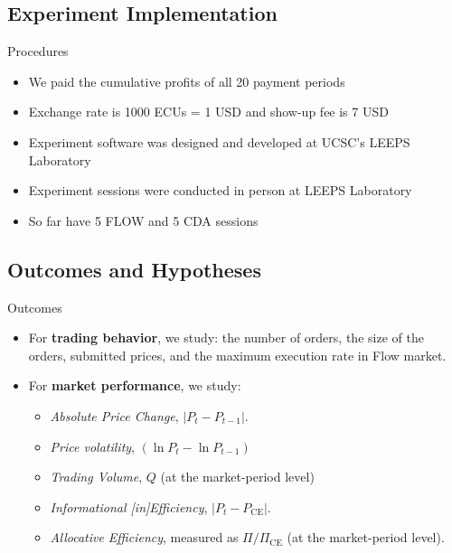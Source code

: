 \documentclass[10pt]{beamer}
\begin{document}
\subsection{Experiment Implementation}

\begin{frame}{Procedures}
    \begin{itemize}
        \item We paid the cumulative profits of all 20 payment periods
        \item Exchange rate is 1000 ECUs = 1 USD and show-up fee is 7 USD \pause
        \item Experiment software was designed and developed at UCSC's LEEPS Laboratory
        \item Experiment sessions were conducted in person at LEEPS Laboratory
        \item So far have 5  FLOW and 5 CDA sessions
    \end{itemize}
\end{frame}

\subsection{Outcomes and Hypotheses}


\begin{frame}{Outcomes}
    \begin{itemize}
        \item For \textbf{trading behavior}, we study: 
     the number of orders, the size of the orders, submitted prices, and
     the maximum execution rate in Flow market. \pause
        \item For \textbf{market performance}, we study:
        \begin{itemize}
        \item \textit{Absolute Price Change}, $|P_t - P_{t-1}|$. 
        \item \textit{Price volatility}, $(\ln P_t - \ln P_{t-1})$ 
         \item \textit{Trading Volume}, $Q$ (at the market-period level)
\item\textit{Informational [in]Efficiency},  \( |P_t - P_{\text{CE}}| \). 
    \item\textit{Allocative Efficiency}, measured as \( \Pi/\Pi_{\text{CE}}\) (at the market-period level). 
        \end{itemize}
     
    \end{itemize}
\end{frame}
\end{document}
